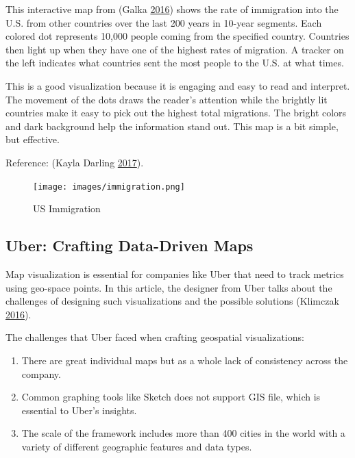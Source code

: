 \documentclass[]{book}
\providecommand{\tightlist}{%
  \setlength{\itemsep}{0pt}\setlength{\parskip}{0pt}}
\begin{document}
This interactive map from (Galka \protect\hyperlink{ref-immigration}{2016}) shows the rate of immigration into the U.S. from other countries over the last 200 years in 10-year segments. Each colored dot represents 10,000 people coming from the specified country. Countries then light up when they have one of the highest rates of migration. A tracker on the left indicates what countries sent the most people to the U.S. at what times.

This is a good visualization because it is engaging and easy to read and interpret. The movement of the dots draws the reader's attention while the brightly lit countries make it easy to pick out the highest total migrations. The bright colors and dark background help the information stand out. This map is a bit simple, but effective.

Reference: (Kayla Darling \protect\hyperlink{ref-cool_data}{2017}).

\begin{figure}
\centering
\texttt{[image: images/immigration.png]}
\caption{US Immigration}
\end{figure}

\hypertarget{uber-crafting-data-driven-maps}{%
\subsection{Uber: Crafting Data-Driven Maps}\label{uber-crafting-data-driven-maps}}

Map visualization is essential for companies like Uber that need to track metrics using geo-space points. In this article, the designer from Uber talks about the challenges of designing such visualizations and the possible solutions (Klimczak \protect\hyperlink{ref-uber_maps}{2016}).

The challenges that Uber faced when crafting geospatial visualizations:

\begin{enumerate}
\def\labelenumi{\arabic{enumi}.}
\tightlist
\item
  There are great individual maps but as a whole lack of consistency across the company.
\item
  Common graphing tools like Sketch does not support GIS file, which is essential to Uber's insights.
\item
  The scale of the framework includes more than 400 cities in the world with a variety of different geographic features and data types.
\end{enumerate}
\end{document}
